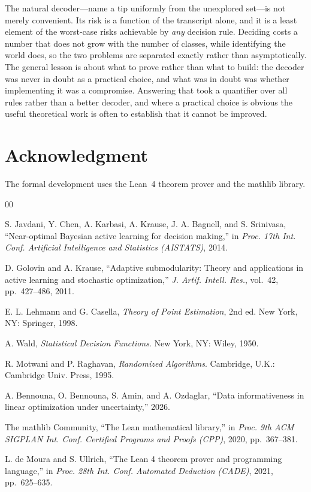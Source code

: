 The natural decoder---name a tip uniformly from the unexplored set---is not merely convenient.
Its risk is a function of the transcript alone, and it is a least element of the worst-case
risks achievable by \emph{any} decision rule. Deciding costs a number that does not grow with
the number of classes, while identifying the world does, so the two problems are separated
exactly rather than asymptotically. The general lesson is about what to prove rather than what
to build: the decoder was never in doubt as a practical choice, and what was in doubt was
whether implementing it was a compromise. Answering that took a quantifier over all rules
rather than a better decoder, and where a practical choice is obvious the useful theoretical
work is often to establish that it cannot be improved.

\section*{Acknowledgment}

The formal development uses the Lean~4 theorem prover and the mathlib library.

\begin{thebibliography}{00}

 S. Javdani, Y. Chen, A. Karbasi, A. Krause, J. A. Bagnell, and
S. Srinivasa, ``Near-optimal Bayesian active learning for decision making,'' in
\emph{Proc. 17th Int. Conf. Artificial Intelligence and Statistics (AISTATS)}, 2014.

 D. Golovin and A. Krause, ``Adaptive submodularity: Theory and
applications in active learning and stochastic optimization,'' \emph{J. Artif. Intell. Res.},
vol.~42, pp.~427--486, 2011.

 E. L. Lehmann and G. Casella, \emph{Theory of Point Estimation},
2nd ed. New York, NY: Springer, 1998.

 A. Wald, \emph{Statistical Decision Functions}. New York, NY: Wiley, 1950.

 R. Motwani and P. Raghavan, \emph{Randomized Algorithms}. Cambridge,
U.K.: Cambridge Univ. Press, 1995.

 A. Bennouna, O. Bennouna, S. Amin, and A. Ozdaglar, ``Data
informativeness in linear optimization under uncertainty,'' 2026.

 The mathlib Community, ``The Lean mathematical library,'' in
\emph{Proc. 9th ACM SIGPLAN Int. Conf. Certified Programs and Proofs (CPP)}, 2020,
pp.~367--381.

 L. de Moura and S. Ullrich, ``The Lean 4 theorem prover and
programming language,'' in \emph{Proc. 28th Int. Conf. Automated Deduction (CADE)}, 2021,
pp.~625--635.

\end{thebibliography}




